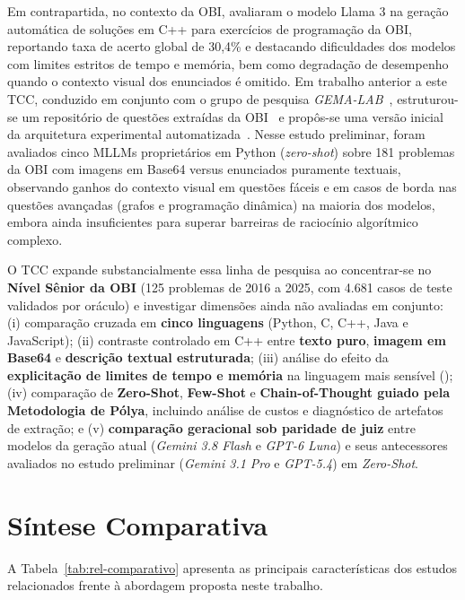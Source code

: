 Em contrapartida, no contexto da OBI, \citet{alcantara2025assessing} avaliaram o modelo Llama 3 na geração automática de soluções em C++ para exercícios de programação da OBI, reportando taxa de acerto global de 30,4\% e destacando dificuldades dos modelos com limites estritos de tempo e memória, bem como degradação de desempenho quando o contexto visual dos enunciados é omitido. Em trabalho anterior a este TCC, conduzido em conjunto com o grupo de pesquisa \textit{GEMA-LAB}~\citep{angelo2026ise}, estruturou-se um repositório de questões extraídas da OBI~\citep{problems2026} e propôs-se uma versão inicial da arquitetura experimental automatizada~\citep{obibenchmarking2026}. Nesse estudo preliminar, foram avaliados cinco MLLMs proprietários em Python (\textit{zero-shot}) sobre 181 problemas da OBI com imagens em Base64 versus enunciados puramente textuais, observando ganhos do contexto visual em questões fáceis e em casos de borda nas questões avançadas (grafos e programação dinâmica) na maioria dos modelos, embora ainda insuficientes para superar barreiras de raciocínio algorítmico complexo.

O TCC expande substancialmente essa linha de pesquisa ao concentrar-se no \textbf{Nível Sênior da OBI} (125 problemas de 2016 a 2025, com 4.681 casos de teste validados por oráculo) e investigar dimensões ainda não avaliadas em conjunto: (i) comparação cruzada em \textbf{cinco linguagens} (Python, C, C++, Java e JavaScript); (ii) contraste controlado em C++ entre \textbf{texto puro}, \textbf{imagem em Base64} e \textbf{descrição textual estruturada}; (iii) análise do efeito da \textbf{explicitação de limites de tempo e memória} na linguagem mais sensível (); (iv) comparação de \textbf{Zero-Shot}, \textbf{Few-Shot} e \textbf{Chain-of-Thought guiado pela Metodologia de Pólya}, incluindo análise de custos e diagnóstico de artefatos de extração; e (v) \textbf{comparação geracional sob paridade de juiz} entre modelos da geração atual (\textit{Gemini 3.8 Flash} e \textit{GPT-6 Luna}) e seus antecessores avaliados no estudo preliminar (\textit{Gemini 3.1 Pro} e \textit{GPT-5.4}) em  \textit{Zero-Shot}.

\section{Síntese Comparativa}\label{sec:rel-sintese}

A Tabela~\ref{tab:rel-comparativo} apresenta as principais características dos estudos relacionados frente à abordagem proposta neste trabalho.

